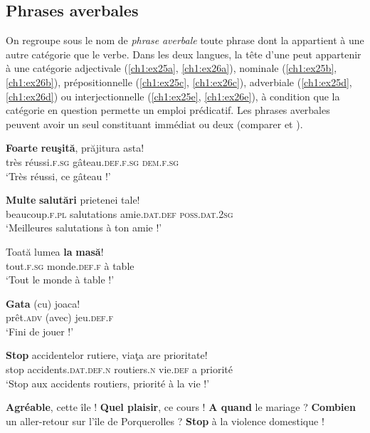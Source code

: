\subsection{Phrases averbales} \label{ch1:sect1.3.2}

On regroupe sous le nom de \textit{phrase} \textit{averbale} toute phrase dont la  appartient à une autre catégorie que le verbe. Dans les deux langues, la tête d’une  peut appartenir à une catégorie adjectivale (\ref{ch1:ex25a}, \ref{ch1:ex26a}), nominale (\ref{ch1:ex25b}, \ref{ch1:ex26b}), prépositionnelle (\ref{ch1:ex25c}, \ref{ch1:ex26c}), adverbiale (\ref{ch1:ex25d}, \ref{ch1:ex26d}) ou interjectionnelle (\ref{ch1:ex25e}, \ref{ch1:ex26e}), à condition que la catégorie en question permette un emploi prédicatif. Les phrases averbales peuvent avoir un seul constituant immédiat ou deux (comparer  et ).

\ea \label{ch1:ex25}
\ea
\gll   \textbf{Foarte} \textbf{reuşită},  prăjitura  asta! \label{ch1:ex25a}\\
très  réussi.\textsc{f.sg}  gâteau.\textsc{def.f.sg}  \textsc{dem.f.sg} \\
\glt ‘Très réussi, ce gâteau !’ 

\ex
\gll   \textbf{Multe} \textbf{salutări}  prietenei  tale! \label{ch1:ex25b}\\
    beaucoup\textsc{.f.pl}  salutations  amie.\textsc{dat.def}  \textsc{poss.dat.2sg}\\
\glt ‘Meilleures salutations à ton amie !’ 

\ex
\gll  Toată  lumea  \textbf{la} \textbf{masă}! \label{ch1:ex25c}\\
  tout\textsc{.f.sg}  monde\textsc{.def.f}  à  table\\
\glt ‘Tout le monde à table !’ 

\ex 
\gll \textbf{Gata}  (cu)  joaca! \label{ch1:ex25d}\\
  prêt\textsc{.adv}  (avec)  jeu\textsc{.def.f}  \\
\glt ‘Fini de jouer !’ 

\ex
\gll  \textbf{Stop}  accidentelor  rutiere,  viaţa  are  prioritate! \label{ch1:ex25e}\\
    stop  accidents\textsc{.dat.def.n}  routiers\textsc{.n}  vie\textsc{.def}  a  priorité\\
\glt ‘Stop aux accidents routiers, priorité à la vie !’ 
\z
\z


\ea
\ea  \textbf{Agréable}, cette île !  \label{ch1:ex26a}
\ex  \textbf{Quel plaisir}, ce cours ! \label{ch1:ex26b}
\ex  \textbf{A quand} le mariage ? \label{ch1:ex26c}
\ex  \textbf{Combien} un aller-retour sur l’île de Porquerolles ? \label{ch1:ex26d}
\ex  \textbf{Stop} à la violence domestique ! \label{ch1:ex26e}
\z
\z


